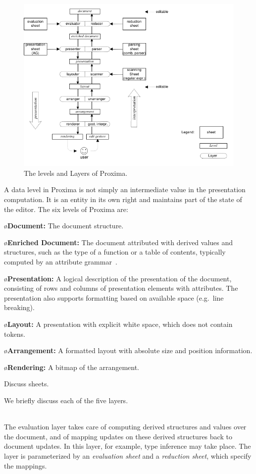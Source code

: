 \documentclass[10pt]{article}
\begin{document}
\begin{figure}
\includegraphics[width=12cm]{images/LayerOverview}
\caption{The levels and Layers of Proxima.}
\label{fig:levelsAndLayers}
\end{figure}

A data level in Proxima is not simply an intermediate value in the presentation computation. It is an entity in its own right and maintains part of the state of the editor. The six levels of Proxima are:


\bl
\o {\bf Document:} The document structure.

\o {\bf Enriched Document:} The document attributed with derived values and structures, such as the type of a function or a table of contents, typically computed by an attribute grammar~\cite{reps84synGen}.

\o{\bf Presentation:} A logical description of the presentation of the document, consisting of rows and columns of presentation elements with attributes. The presentation also supports formatting based on available space (e.g.\ line breaking).

\o{\bf Layout:} A presentation with explicit white space, which does not contain tokens.

\o{\bf Arrangement:} A formatted layout with absolute size and position information.

\o{\bf Rendering:} A bitmap of the arrangement.
\el


Discuss sheets.

\bc
We briefly discuss each of the five layers.

\\
The evaluation layer takes care of computing derived structures and values over the document, and of mapping updates on these derived structures back to document updates. In this layer, for example, type inference may take place. The layer is parameterized by an {\em evaluation sheet} and a {\em reduction sheet}, which specify the mappings. 
\end{document}
